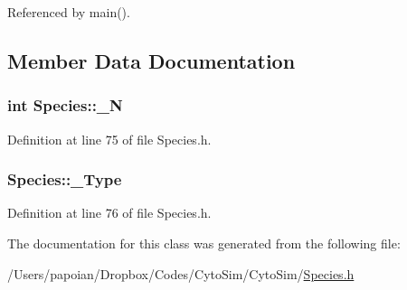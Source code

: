 Referenced by main().



\subsection{Member Data Documentation}
\hypertarget{classSpecies_aaf64f0a20dc213a6f03c69e7c3caa43a}{
\subsubsection[{\-\_\-\-N}]{\setlength{\rightskip}{0pt plus 5cm}int {\bf Species\-::\-\_\-\-N}}}\label{classSpecies_aaf64f0a20dc213a6f03c69e7c3caa43a}


Definition at line 75 of file Species.\-h.

\hypertarget{classSpecies_ae80ccbaa2b115cea250b7f87ce517105}{
\subsubsection[{\-\_\-\-Type}]{ {\bf Species\-::\-\_\-\-Type}}}\label{classSpecies_ae80ccbaa2b115cea250b7f87ce517105}


Definition at line 76 of file Species.\-h.



The documentation for this class was generated from the following file\-:\begin{DoxyCompactItemize}
\item 
/\-Users/papoian/\-Dropbox/\-Codes/\-Cyto\-Sim/\-Cyto\-Sim/\hyperlink{Species_8h}{Species.\-h}\end{DoxyCompactItemize}
